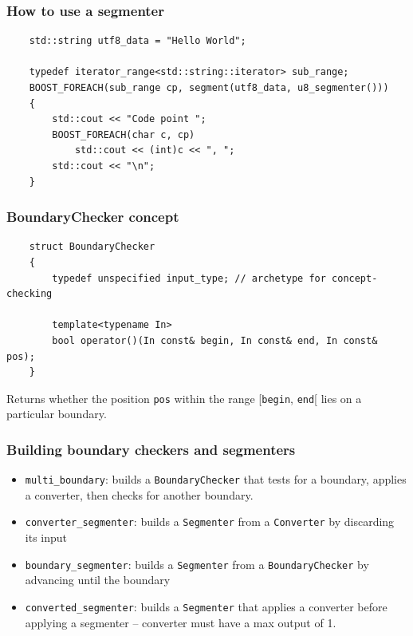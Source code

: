 \documentclass{beamer}
\begin{document}
\begin{frame}[fragile]
	\frametitle{How to use a segmenter}
	
	\begin{lstlisting}
	std::string utf8_data = "Hello World";
	
	typedef iterator_range<std::string::iterator> sub_range;
	BOOST_FOREACH(sub_range cp, segment(utf8_data, u8_segmenter()))
	{
	    std::cout << "Code point "; 
	    BOOST_FOREACH(char c, cp)
	        std::cout << (int)c << ", ";
	    std::cout << "\n";
	} 
	\end{lstlisting}
\end{frame}

\begin{frame}[fragile]
	\frametitle{BoundaryChecker concept}
	
	\begin{lstlisting}
	struct BoundaryChecker
	{
	    typedef unspecified input_type; // archetype for concept-checking
	
	    template<typename In>
	    bool operator()(In const& begin, In const& end, In const& pos);
	}
	\end{lstlisting}
	
	Returns whether the position \lstinline{pos} within the range [\lstinline{begin}, \lstinline{end}[ lies
	on a particular boundary.
	
\end{frame}

\begin{frame}
	\frametitle{Building boundary checkers and segmenters}
	
	\begin{itemize}
		\item \lstinline{multi_boundary}: builds a \lstinline{BoundaryChecker} that tests for a boundary, applies a converter, then checks for another boundary.
		\item \lstinline{converter_segmenter}: builds a \lstinline{Segmenter} from a \lstinline{Converter} by discarding its input
		\item \lstinline{boundary_segmenter}: builds a \lstinline{Segmenter} from a \lstinline{BoundaryChecker} by advancing until the boundary
		\item \lstinline{converted_segmenter}: builds a \lstinline{Segmenter} that applies a converter before applying a segmenter -- converter must have a max output of 1.
	\end{itemize}
	
\end{frame}
\end{document}
